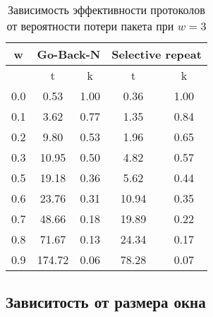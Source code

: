 \documentclass[a4paper,12pt]{article}
\begin{document}
\begin{table}[ht!]
    \begin{center}
        \caption{Зависимость эффективности протоколов от вероятности
        потери пакета при $w=3$}\label{tab:1}
        \begin{tabular}{|c|c|c|c|c|}
        \hline
        w & \multicolumn{2}{|c|}{Go-Back-N} & \multicolumn{2}{|c|}{Selective repeat}\\
        \hline
          & t & k & t & k \\ 
        \hline
        0.0	 & 0.53  & 1.00    & 0.36  & 1.00   \\ \hline
        0.1	 & 3.62  & 0.77    & 1.35  & 0.84   \\ \hline
        0.2	 & 9.80  & 0.53    & 1.96  & 0.65   \\ \hline
        0.3	 & 10.95  & 0.50    & 4.82  & 0.57  \\ \hline
        0.5	 & 19.18  & 0.36    & 5.62  & 0.44   \\ \hline
        0.6	 & 23.76  & 0.31    & 10.94  & 0.35   \\ \hline
        0.7	 & 48.66  & 0.18    & 19.89  & 0.22   \\ \hline
        0.8	 & 71.67  & 0.13    & 24.34  & 0.17   \\ \hline
        0.9	 & 174.72  & 0.06    & 78.28  & 0.07  \\ \hline
        \end{tabular}
    \end{center}
\end{table}

\begin{figure}[ht!]
\begin{minipage}[h]{0.5\linewidth}
\end{minipage}
\hfill
\begin{minipage}[h]{0.5\linewidth}
\end{minipage}
\end{figure} 

\newpage

\subsection{Зависитость от размера окна}
\end{document}
